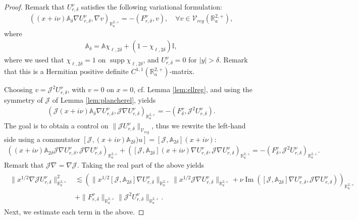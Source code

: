\documentclass[report]{elsarticle}
\numberwithin{theorem}{section}
\renewcommand{\Im}{\operatorname{Im}}
\begin{document}
\begin{proof}
	Remark that $U^{\nu}_{r,\delta}$ satisfies the following variational formulation:
	\begin{align}
		\label{eq:varf}
		((x+i\nu)\mathbb{A}_{\delta}\nabla U^{\nu}_{r,\delta}, \nabla v)_{\mathbb{R}^{2,+}_a}=-(F^{\nu}_{r,\delta}, v), \quad \forall v\in \mathcal{V}_{reg}(\mathbb{R}_a^{2,+}),
	\end{align}
where 
\begin{align*}
	\mathbb{A}_{\delta}=\mathbb{A}\chi_{\ell, 2\delta}+(1-\chi_{\ell, 2\delta})\mathbb{I},
\end{align*}
where we used that $\chi_{\ell,2\delta}=1$ on $\operatorname{supp}\chi_{\ell,2\delta}$, and $U^{\nu}_{r,\delta}=0$ for $|y|>\delta$. Remark that this is a Hermitian positive definite $C^{1,1}(\mathbb{R}^{2,+}_{a})$-matrix. 


	Choosing $v=\mathcal{J}^2U^{\nu}_{r,\delta}$, with $v=0$ on $x=0$, cf. Lemma \ref{lem:ellreg},  and using the symmetry of $\mathcal{J}$ of Lemma \ref{lem:plancherel}, yields 
	\begin{align*}
		(\mathcal{J}(x+i\nu)\mathbb{A}_{\delta}\nabla U^{\nu}_{r,\delta}, \mathcal{J}\nabla U^{\nu}_{r,\delta})_{\mathbb{R}^{2,+}_a}=-(F^{\nu}_{\delta}, \mathcal{J}^2U^{\nu}_{r,\delta}).	
	\end{align*}
	The goal is to obtain a control on $\|\mathcal{J}U^{\nu}_{r,\delta}\|_{\mathcal{V}_{reg}}$, thus we rewrite the left-hand side using a commutator $[\mathcal{J},(x+i\nu)\mathbb{A}_{2\delta} )u]=[\mathcal{J},\mathbb{A}_{2\delta}](x+i\nu)$: 
	\begin{align*}
		((x+i\nu)\mathbb{A}_{2\delta}\mathcal{J}\nabla U^{\nu}_{r,\delta}, \mathcal{J}\nabla U^{\nu}_{r,\delta})_{\mathbb{R}^{2,+}_a}+	([\mathcal{J},\mathbb{A}_{2\delta}](x+i\nu)\nabla U^{\nu}_{r,\delta}, \mathcal{J}\nabla U^{\nu}_{r,\delta})_{\mathbb{R}^{2,+}_a}=-(F^{\nu}_{\delta}, \mathcal{J}^2U^{\nu}_{r,\delta})_{\mathbb{R}^{2,+}_a}.	
	\end{align*}
	Remark that $\mathcal{J}\nabla=\nabla\mathcal{J}$. Taking the real part of the above yields
	\begin{align}
		\label{eq:a2delta}
		\begin{split}
		\|x^{1/2}\nabla \mathcal{J}U^{\nu}_{r,\delta}\|^2_{\mathbb{R}^{2,+}_a}&\lesssim \left(\|x^{1/2}[\mathcal{J},\mathbb{A}_{2\delta}]\nabla U^{\nu}_{r,\delta}\|_{\mathbb{R}^{2,+}_a}\| x^{1/2}\mathcal{J}\nabla U^{\nu}_{r,\delta}\|_{\mathbb{R}^{2,+}_a}+\nu\Im ([\mathcal{J}, \mathbb{A}_{2\delta}]\nabla U^{\nu}_{r,\delta}, \mathcal{J}\nabla U^{\nu}_{r,\delta})\right)_{\mathbb{R}^{2,+}_a}\\
		&+\|F^{\nu}_{r,\delta}\|_{\mathbb{R}^{2,+}_a}\| \mathcal{J}^2U^{\nu}_{r,\delta}\|_{\mathbb{R}^{2,+}_a}. 
		\end{split}
	\end{align}
Next, we estimate each term in the above. 


\end{proof}
\end{document}
